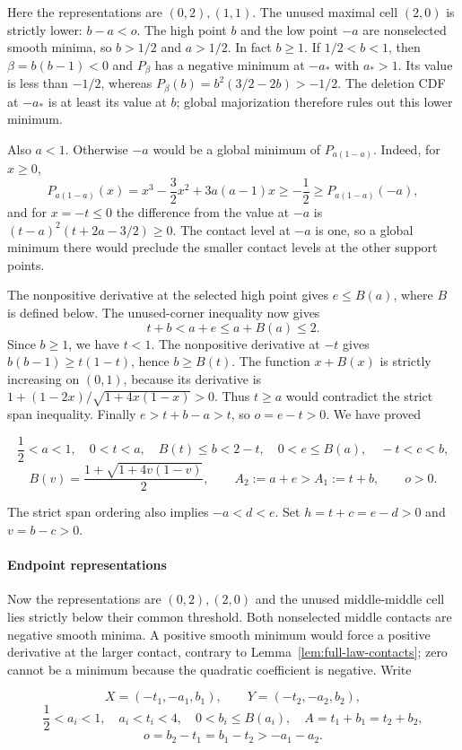 Here the representations are $(0,2),(1,1)$. The unused maximal cell $(2,0)$ is
strictly lower: $b-a<o$. The high point $b$ and the low point $-a$ are
nonselected smooth minima, so $b>1/2$ and $a>1/2$.
In fact $b\ge1$. If $1/2<b<1$, then $\beta=b(b-1)<0$
and $P_\beta$ has a negative minimum at $-a_*$ with $a_*>1$.
Its value is less than $-1/2$, whereas
$P_\beta(b)=b^2(3/2-2b)>-1/2$.
The deletion CDF at $-a_*$ is at least its value at $b$;
global majorization therefore rules out this lower minimum.

Also $a<1$. Otherwise $-a$ would be a global minimum of
$P_{a(1-a)}$. Indeed, for $x\ge0$,
\[
 P_{a(1-a)}(x)=x^3-\frac32x^2+3a(a-1)x
 \ge-\frac12\ge P_{a(1-a)}(-a),
\]
and for $x=-t\le0$ the difference from the value at $-a$ is
$(t-a)^2(t+2a-3/2)\ge0$.
The contact level at $-a$ is one, so a global minimum there would
preclude the smaller contact levels at the other support points.

The nonpositive derivative at the selected high point gives
$e\le B(a)$, where $B$ is defined below. The unused-corner inequality
now gives
\[
 t+b<a+e\le a+B(a)\le2.
\]
Since $b\ge1$, we have $t<1$. The nonpositive derivative at $-t$
gives $b(b-1)\ge t(1-t)$, hence $b\ge B(t)$.
The function $x+B(x)$ is strictly increasing on $(0,1)$, because
its derivative is $1+(1-2x)/\sqrt{1+4x(1-x)}>0$.
Thus $t\ge a$ would contradict the strict span inequality.
Finally $e>t+b-a>t$, so $o=e-t>0$. We have proved

\[
 \frac12<a<1,\quad 0<t<a,\quad
 B(t)\leq b<2-t,\quad 0<e\leq B(a),\quad -t<c<b,
\]
\[
 B(v)=\frac{1+\sqrt{1+4v(1-v)}}2,\qquad
 A_2:=a+e>A_1:=t+b,\qquad o>0.
\tag{B.28.3}\label{contact:two-owner-321-contact-reduction-3}
\]

The strict span ordering also implies $-a<d<e$. Set $h=t+c=e-d>0$ and $v=b-c>0$.

\paragraph{Endpoint representations}

Now the representations are $(0,2),(2,0)$ and the unused middle-middle cell lies
strictly below their common threshold. Both nonselected middle contacts
are negative smooth minima. A positive smooth minimum would force a positive derivative at the larger contact, contrary to Lemma~\ref{lem:full-law-contacts}; zero cannot be a minimum because the quadratic coefficient is negative. Write

\[
 X=(-t_1,-a_1,b_1),\qquad Y=(-t_2,-a_2,b_2),
\]
\[
 \frac12<a_i<1,\quad a_i<t_i<4,\quad 0<b_i\leq B(a_i),
 \quad A=t_1+b_1=t_2+b_2,
\]
\[
 o=b_2-t_1=b_1-t_2>-a_1-a_2.
\tag{B.28.4}\label{contact:two-owner-321-contact-reduction-11}
\]

